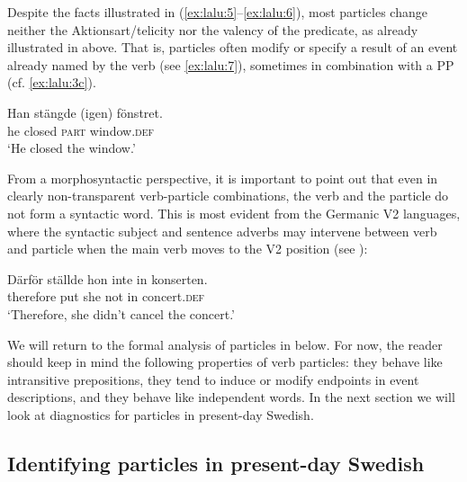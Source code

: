 \documentclass[output=paper]{langscibook}
\begin{document}
\ea\label{ex:lalu:6}
\z
\z

Despite the facts illustrated in (\ref{ex:lalu:5}--\ref{ex:lalu:6}), most particles change neither the Aktionsart/telicity nor the valency of the predicate, as already illustrated in  above. That is, particles often modify or specify a result of an event already named by the verb (see \ref{ex:lalu:7}), sometimes in combination with a PP (cf. \ref{ex:lalu:3c}).


\ea\label{ex:lalu:7}
\gll  Han     stängde   (igen)   fönstret.\\
he       closed     \textsc{part}     window.\textsc{def}\\
\glt `He closed the window.'
\z

From a morphosyntactic perspective, it is important to point out that even in clearly non-transparent verb-particle combinations, the verb and the particle do not form a syntactic word. This is most evident from the Germanic V2 languages, where the syntactic subject and sentence adverbs may intervene between verb and particle when the main verb moves to the V2 position (see \citealt{Afarli1985}):


\ea\label{ex:lalu:8}
\gll  Därför   ställde   hon     inte     in   konserten.\\
therefore  put   she   not     in     concert.\textsc{def}\\
\glt `Therefore, she didn’t cancel the concert.'
\z


We will return to the formal analysis of particles in  below. For now, the reader should keep in mind the following properties of verb particles: they behave like intransitive prepositions, they tend to induce or modify endpoints in event descriptions, and they behave like independent words. In the next section we will look at diagnostics for particles in present-day Swedish.


\subsection{Identifying particles in present-day Swedish}\label{sec:lalu:2.2}
\end{document}
